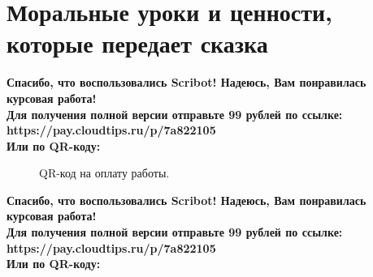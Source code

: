\documentclass{article}
\begin{document}
\section{Моральные уроки и ценности, которые передает сказка}
\begin{center}
    \textbf{
        Спасибо, что воспользовались Scribot! Надеюсь, Вам понравилась курсовая работа!\\
        Для получения полной версии отправьте 99 рублей по ссылке:\\
        https://pay.cloudtips.ru/p/7a822105\\
        Или по QR-коду:\\
    }
\end{center}
\begin{figure}[h]
    \caption{QR-код на оплату работы.}
    \label{ris:image}
\end{figure}
\newpage
\begin{center}
    \textbf{
        Спасибо, что воспользовались Scribot! Надеюсь, Вам понравилась курсовая работа!\\
        Для получения полной версии отправьте 99 рублей по ссылке:\\
        https://pay.cloudtips.ru/p/7a822105\\
        Или по QR-коду:\\
    }
\end{center}
\end{document}
